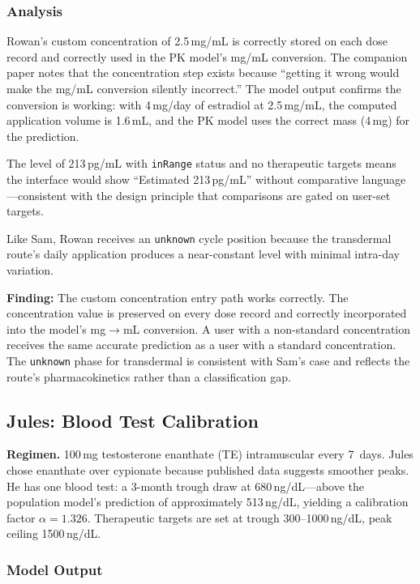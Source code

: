 \documentclass[11pt,a4paper]{article}
\newcommand{\code}[1]{\texttt{\small #1}}
\begin{document}
\subsubsection{Analysis}

Rowan's custom concentration of 2.5\,mg/mL is correctly stored on each dose
record and correctly used in the PK model's mg/mL conversion. The companion
paper notes that the concentration step exists because ``getting it wrong
would make the mg/mL conversion silently incorrect.'' The model output
confirms the conversion is working: with 4\,mg/day of estradiol at
2.5\,mg/mL, the computed application volume is 1.6\,mL, and the PK model
uses the correct mass (4\,mg) for the prediction.

The level of 213\,pg/mL with \code{inRange} status and no therapeutic
targets means the interface would show ``Estimated 213\,pg/mL'' without
comparative language---consistent with the design principle that comparisons
are gated on user-set targets.

Like Sam, Rowan receives an \code{unknown} cycle position because the
transdermal route's daily application produces a near-constant level with
minimal intra-day variation.

\textbf{Finding:} The custom concentration entry path works correctly. The
concentration value is preserved on every dose record and correctly
incorporated into the model's mg$\rightarrow$mL conversion. A user with a
non-standard concentration receives the same accurate prediction as a user
with a standard concentration. The \code{unknown} phase for transdermal is
consistent with Sam's case and reflects the route's pharmacokinetics rather
than a classification gap.

\subsection{Jules: Blood Test Calibration}
\label{sec:jules}

\textbf{Regimen.} 100\,mg testosterone enanthate (TE) intramuscular every
7~days. Jules chose enanthate over cypionate because published data suggests
smoother peaks. He has one blood test: a 3-month trough draw at
680\,ng/dL---above the population model's prediction of approximately
513\,ng/dL, yielding a calibration factor $\alpha = 1.326$. Therapeutic
targets are set at trough 300--1000\,ng/dL, peak ceiling 1500\,ng/dL.

\subsubsection{Model Output}
\end{document}
